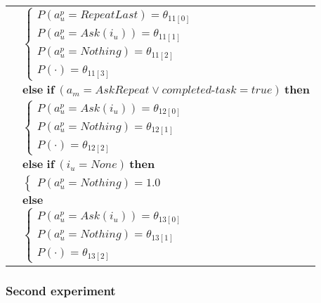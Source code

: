 \begin{small}
\begin{longtable}{p{1cm}p{14cm}}
& \;\;\;\;\; $ \begin{cases}P(\mathit{a_u^p}\!=\!\mathit{RepeatLast})\!=\!\theta_{\mathrm{11[0]}} \\
P(\mathit{a_u^p}\!=\!\mathit{Ask({i_u})})\!=\!\theta_{\mathrm{11[1]}} \\
P(\mathit{a_u^p}\!=\!\mathit{Nothing})\!=\!\theta_{\mathrm{11[2]}} \\
P(\cdot)\!=\!\theta_{\mathrm{11[3]}} \end{cases}$\\ & $ \textbf{else if} \ (\mathit{a_m}\!=\!\mathit{AskRepeat} \lor \mathit{completed\mbox{-}task}\!=\!\mathit{true}) \ \textbf{then}$ \\
& \;\;\;\;\; $ \begin{cases}P(\mathit{a_u^p}\!=\!\mathit{Ask({i_u})})\!=\!\theta_{\mathrm{12[0]}} \\
P(\mathit{a_u^p}\!=\!\mathit{Nothing})\!=\!\theta_{\mathrm{12[1]}} \\
P(\cdot)\!=\!\theta_{\mathrm{12[2]}} \end{cases}$\\ & $ \textbf{else if} \ (\mathit{i_u}\!=\!\mathit{None}) \ \textbf{then}$ \\
& \;\;\;\;\; $ \begin{cases}P(\mathit{a_u^p}\!=\!\mathit{Nothing})\!=\!1.0 \end{cases}$\\ & $ \textbf{else}$ \\
& \;\;\;\;\; $ \begin{cases}P(\mathit{a_u^p}\!=\!\mathit{Ask({i_u})})\!=\!\theta_{\mathrm{13[0]}} \\
P(\mathit{a_u^p}\!=\!\mathit{Nothing})\!=\!\theta_{\mathrm{13[1]}} \\
P(\cdot)\!=\!\theta_{\mathrm{13[2]}} \end{cases}$ 
\end{longtable}
\end{small}

\subsubsection*{Second experiment}

